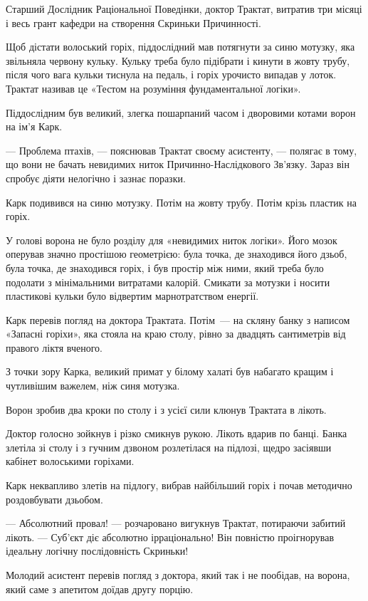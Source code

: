 \documentclass[12pt, a4paper, openany]{book}
\begin{document}
\begin{terrybox}
Старший Дослідник Раціональної Поведінки, доктор Трактат, витратив три місяці і весь грант кафедри на створення Скриньки Причинності.

Щоб дістати волоський горіх, піддослідний мав потягнути за синю мотузку, яка звільняла червону кульку. Кульку треба було підібрати і кинути в жовту трубу, після чого вага кульки тиснула на педаль, і горіх урочисто випадав у лоток. Трактат називав це «Тестом на розуміння фундаментальної логіки».

Піддослідним був великий, злегка пошарпаний часом і дворовими котами ворон на ім'я Карк.

--- Проблема птахів, --- пояснював Трактат своєму асистенту, --- полягає в тому, що вони не бачать невидимих ниток Причинно-Наслідкового Зв'язку. Зараз він спробує діяти нелогічно і зазнає поразки.

\medskip
Карк подивився на синю мотузку. Потім на жовту трубу. Потім крізь пластик на горіх.

У голові ворона не було розділу для «невидимих ниток логіки». Його мозок оперував значно простішою геометрією: була точка, де знаходився його дзьоб, була точка, де знаходився горіх, і був простір між ними, який треба було подолати з мінімальними витратами калорій. Смикати за мотузки і носити пластикові кульки було відвертим марнотратством енергії.

Карк перевів погляд на доктора Трактата. Потім~--- на скляну банку з написом «Запасні горіхи», яка стояла на краю столу, рівно за двадцять сантиметрів від правого ліктя вченого.

З точки зору Карка, великий примат у білому халаті був набагато кращим і чутливішим важелем, ніж синя мотузка.

Ворон зробив два кроки по столу і з усієї сили клюнув Трактата в лікоть.

Доктор голосно зойкнув і різко смикнув рукою. Лікоть вдарив по банці. Банка злетіла зі столу і з гучним дзвоном розлетілася на підлозі, щедро засіявши кабінет волоськими горіхами.

Карк неквапливо злетів на підлогу, вибрав найбільший горіх і почав методично роздовбувати дзьобом.

--- Абсолютний провал! --- розчаровано вигукнув Трактат, потираючи забитий лікоть. --- Суб'єкт діє абсолютно ірраціонально! Він повністю проігнорував ідеальну логічну послідовність Скриньки!

\medskip
Молодий асистент перевів погляд з доктора, який так і не пообідав, на ворона, який саме з апетитом доїдав другу порцію.


\end{terrybox}
\end{document}
